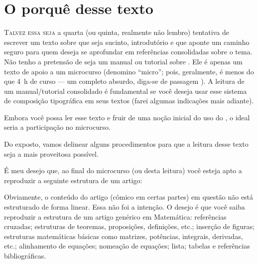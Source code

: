
\chapter*{O porquê desse texto}
\label{chap:intro}

\lettrine[lines=3]{\color{azulUFRB} \initial T}{alvez essa seja} a quarta (ou 
quinta, realmente não lembro) tentativa de escrever um texto sobre  
que seja sucinto, introdutório e que aponte um caminho seguro para quem deseja 
se aprofundar em referências consolidadas sobre o tema.
Não tenho a pretensão de seja um \textsf{manual} ou \textsf{tutorial} sobre 
. 
Ele é apenas um \textsf{texto de apoio} a um microcurso (denomino ``micro''; 
pois, geralmente, é menos do que \qty{4}{h} de curso --- um completo absurdo, 
diga-se de passagem ).
A leitura de um manual/tutorial consolidado é \textsf{fundamental} se você 
deseja usar esse sistema de composição tipográfica em seus textos (farei algumas 
indicações mais adiante). 

\begin{center}
  \begin{PostItNote}[Render=tikz, Color=douradoUFRB]
    \sffamily
    Embora você possa ler esse texto e fruir de uma noção inicial do uso do 
    \textrm{}, o ideal seria a participação no microcurso. 
  \end{PostItNote}
\end{center}

Do exposto, vamos delinear alguns procedimentos para que a leitura desse texto 
seja a mais proveitosa possível. 

É meu desejo que, ao final do microcurso (ou desta leitura) você esteja apto a 
reproduzir a seguinte estrutura de um artigo:

\begin{center}
\end{center}

Obviamente, o conteúdo do artigo (cômico em certas partes) em questão não está 
estruturado de forma linear. 
Essa não foi a intenção. 
O desejo é que você saiba reproduzir a \textsf{estrutura} de um artigo genérico 
em Matemática: referências cruzadas; estruturas de teoremas, proposições, 
definições, etc.; inserção de figuras; estruturas matemáticas básicas como 
matrizes, potências, integrais, derivadas, etc.; alinhamento de equações; 
nomeação de equações; lista; tabelas e referências bibliográficas.

